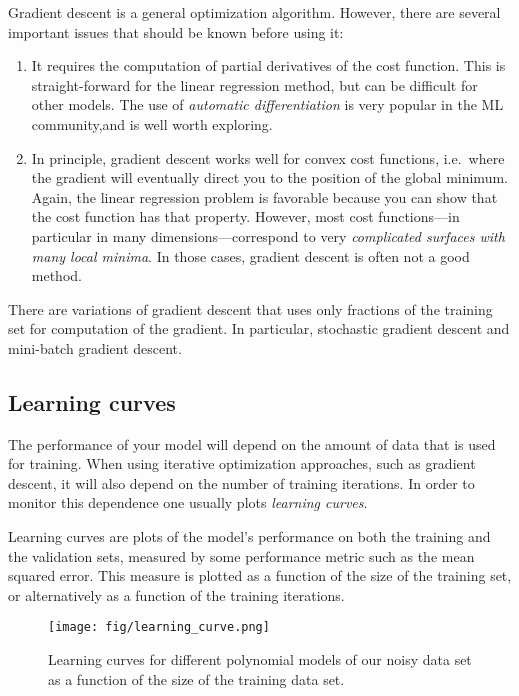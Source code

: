 \documentclass[%
oneside,                 %
final,                   %
10pt]{article}
\begin{document}
\noindent
Gradient descent is a general optimization algorithm. However, there are several important issues that should be known before using it:

\begin{enumerate}
\item It requires the computation of partial derivatives of the cost function. This is straight-forward for the linear regression method, but can be difficult for other models. The use of \emph{automatic differentiation} is very popular in the ML community,and is well worth exploring. 

\item In principle, gradient descent works well for convex cost functions, i.e.~where the gradient will eventually direct you to the position of the global minimum. Again, the linear regression problem is favorable because you can show that the cost function has that property. However, most cost functions---in particular in many dimensions---correspond to very \emph{complicated surfaces with many local minima}. In those cases, gradient descent is often not a good method.
\end{enumerate}

\noindent
There are variations of gradient descent that uses only fractions of the training set for computation of the gradient. In particular, stochastic gradient descent and mini-batch gradient descent.

\subsection{Learning curves}

The performance of your model will depend on the amount of data that is used for training. When using iterative optimization approaches, such as gradient descent, it will also depend on the number of training iterations. In order to monitor this dependence one usually plots \emph{learning curves}.

Learning curves are plots of the model's performance on both the training and the validation sets, measured by some performance metric such as the mean squared error. This measure is plotted as a function of the size of the training set, or alternatively as a function of the training iterations.


\begin{figure}[!ht]  %
  \centerline{\texttt{[image: fig/learning\_curve.png]}}
  \caption{
  Learning curves for different polynomial models of our noisy data set as a function of the size of the training data set. \label{fig-learning_curve}
  }
\end{figure}
\end{document}
